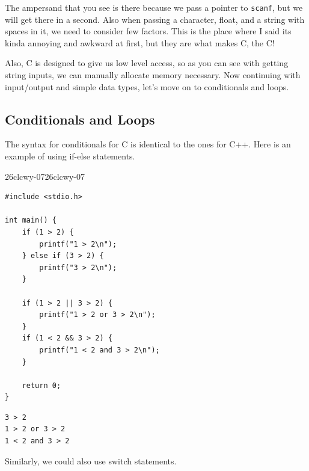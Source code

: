 \documentclass[../../../main.tex]{subfiles}
\begin{document}
The ampersand that you see is there because we pass a pointer to
\verb|scanf|, but we will get there in a second. Also when passing
a character, float, and a string with spaces in it, we need to
consider few factors. This is the place where I said its kinda
annoying and awkward at first, but they are what makes C, the C!

Also, C is designed to give us low level access, so as you can see
with getting string inputs, we can manually allocate memory necessary.
Now continuing with input/output and simple data types, let's move on
to conditionals and loops.

\subsection{Conditionals and Loops}

The syntax for conditionals for C is identical to the ones for C++.
Here is an example of using if-else statements.

\begin{cbox}{26clcwy-07}{26clcwy-07}
\begin{lstlisting}[style=cstyle]
#include <stdio.h>

int main() {
    if (1 > 2) {
        printf("1 > 2\n");
    } else if (3 > 2) {
        printf("3 > 2\n");
    }

    if (1 > 2 || 3 > 2) {
        printf("1 > 2 or 3 > 2\n");
    }
    if (1 < 2 && 3 > 2) {
        printf("1 < 2 and 3 > 2\n");
    }

    return 0;
}
\end{lstlisting}
\end{cbox}
\begin{outputbox}
\begin{lstlisting}[style=basic]
3 > 2
1 > 2 or 3 > 2
1 < 2 and 3 > 2
\end{lstlisting}
\end{outputbox}

Similarly, we could also use switch statements.
\end{document}
